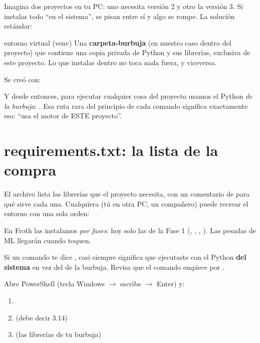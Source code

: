 \documentclass[11pt,a4paper]{article}
\begin{document}
Imagina dos proyectos en tu PC: uno necesita  versión 2 y otro la versión 3.
Si instalas todo ``en el sistema'', se pisan entre sí y algo se rompe. La solución estándar:

\begin{concepto}{entorno virtual (venv)}
Una \textbf{carpeta-burbuja} (en nuestro caso  dentro del proyecto) que
contiene una copia privada de Python y sus librerías, exclusiva de este proyecto.
Lo que instalas dentro no toca nada fuera, y viceversa.

Se creó con: 

Y desde entonces, para ejecutar cualquier cosa del proyecto usamos el Python \emph{de la
burbuja}: . Esa ruta rara del
principio de cada comando significa exactamente eso: ``usa el motor de ESTE proyecto''.
\end{concepto}

\section{requirements.txt: la lista de la compra}

El archivo  lista las librerías que el proyecto necesita, con un
comentario de para qué sirve cada una. Cualquiera (tú en otra PC, un compañero) puede
recrear el entorno con una sola orden:
\begin{center}
\end{center}
En Froth las instalamos \emph{por fases}: hoy solo las de la Fase 1 (,
, , ). Las pesadas de ML llegarán cuando
toquen.

\begin{ojo}
Si un comando te dice , casi siempre
significa que ejecutaste con el Python \textbf{del sistema} en vez del de la burbuja.
Revisa que el comando empiece por .
\end{ojo}

\begin{practica}
Abre PowerShell (tecla Windows $\rightarrow$ escribe  $\rightarrow$ Enter) y:
\begin{enumerate}
  \item {}
  \item {} \quad (debe decir 3.14)
  \item {} \quad (las librerías de tu burbuja)
\end{enumerate}
\end{practica}
\end{document}
